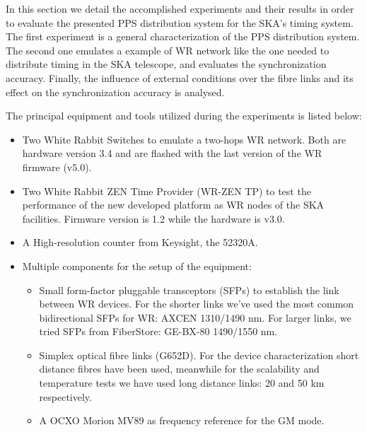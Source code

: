 
In this section we detail the accomplished experiments and their results in 
order to evaluate the presented PPS distribution system for the SKA's timing 
system. The first experiment is a general characterization of the PPS 
distribution system. The second one emulates a example of WR network like the 
one needed to distribute timing in the SKA telescope, and evaluates the 
synchronization accuracy. Finally, the influence of external conditions over 
the fibre links and its effect on the synchronization accuracy is analysed.

The principal equipment and tools utilized during the experiments is listed 
below:

\begin{itemize}
    \item Two White Rabbit Switches to emulate a two-hops WR network. Both are 
    hardware version 3.4 and are flashed with the last version of the WR 
    firmware (v5.0).
    
    \item Two White Rabbit ZEN Time Provider (WR-ZEN TP) to test the 
    performance of the new developed platform as WR nodes of the SKA 
    facilities. Firmware version is 1.2 while the hardware is v3.0.
    
    \item A High-resolution counter from Keysight, the 52320A.
    
    \item Multiple components for the setup of the equipment:
    \begin{itemize}
        \item Small form-factor pluggable transceptors (SFPs) to establish the 
        link between WR devices. For the shorter links we've used the most 
        common bidirectional SFPs for WR: AXCEN 1310/1490 nm. For larger links, 
        we tried 
        SFPs from FiberStore: GE-BX-80 1490/1550 nm.
        \item Simplex optical fibre links (G652D). For the device 
        characterization short distance fibres have been used, meanwhile for 
        the scalability and temperature tests we have used long distance links: 
        20 and 50 km respectively.
        \item A OCXO Morion MV89 as frequency reference for the GM mode.
    \end{itemize}
    
\end{itemize}

